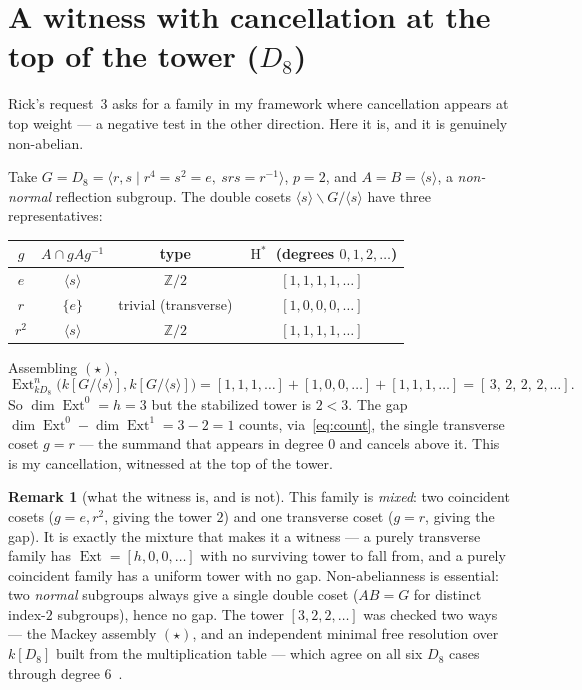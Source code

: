 \documentclass[11pt]{amsart}
\theoremstyle{plain}
\theoremstyle{definition}
\newtheorem{remark}[theorem]{Remark}
\DeclareMathOperator{\Ext}{Ext}
\DeclareMathOperator{\Hh}{H}
\newcommand{\kk}{k}
\newcommand{\dcoset}[3]{#1\backslash #2/#3}
\begin{document}
\section{A witness with cancellation at the top of the tower ($D_8$)}

Rick's request~3 asks for a family in my framework where cancellation appears at top weight ---
a negative test in the other direction. Here it is, and it is genuinely non-abelian.

Take $G=D_8=\langle r,s\mid r^4=s^2=e,\ srs=r^{-1}\rangle$, $p=2$, and
$A=B=\langle s\rangle$, a \emph{non-normal} reflection subgroup. The double cosets
$\dcoset{\langle s\rangle}{G}{\langle s\rangle}$ have three representatives:
\begin{center}
\renewcommand{\arraystretch}{1.2}
\begin{tabular}{@{}cccc@{}}
\toprule
$g$ & $A\cap gAg^{-1}$ & type & $\Hh^{*}$ (degrees $0,1,2,\dots$)\\
\midrule
$e$   & $\langle s\rangle$ & $\mathbb{Z}/2$ & $[1,1,1,1,\dots]$\\
$r$   & $\{e\}$            & trivial (transverse) & $[1,0,0,0,\dots]$\\
$r^2$ & $\langle s\rangle$ & $\mathbb{Z}/2$ & $[1,1,1,1,\dots]$\\
\bottomrule
\end{tabular}
\end{center}
Assembling $(\star)$,
\[
  \Ext^{n}_{kD_8}\big(\kk[G/\langle s\rangle],\kk[G/\langle s\rangle]\big)
    = [1,1,1,\dots]+[1,0,0,\dots]+[1,1,1,\dots]
    = [\,3,\,2,\,2,\,2,\dots].
\]
So $\dim\Ext^0=h=3$ but the stabilized tower is $2<3$. The gap
$\dim\Ext^0-\dim\Ext^1=3-2=1$ counts, via~\eqref{eq:count}, the single transverse coset
$g=r$ --- the summand that appears in degree $0$ and cancels above it. This is my cancellation,
witnessed at the top of the tower.

\begin{remark}[what the witness is, and is not]
This family is \emph{mixed}: two coincident cosets ($g=e,r^2$, giving the tower $2$) and one
transverse coset ($g=r$, giving the gap). It is exactly the mixture that makes it a witness ---
a purely transverse family has $\Ext=[h,0,0,\dots]$ with no surviving tower to fall from, and a
purely coincident family has a uniform tower with no gap. Non-abelianness is essential: two
\emph{normal} subgroups always give a single double coset ($AB=G$ for distinct index-$2$
subgroups), hence no gap. The tower $[3,2,2,\dots]$ was checked two ways --- the Mackey
assembly $(\star)$, and an independent minimal free resolution over $k[D_8]$ built from the
multiplication table --- which agree on all six $D_8$ cases through degree
$6$~\cite{macbeth-d8}.
\end{remark}
\end{document}
